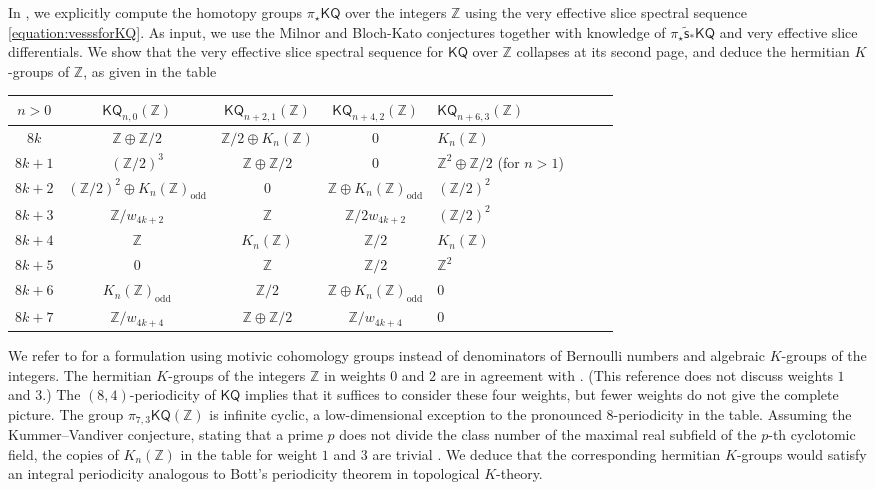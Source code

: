 \documentclass[11pt,hyp,english]{article}
\newcommand{\Z}{\mathbb{Z}}
\newcommand{\KQ}{\mathsf{KQ}}
\newcommand{\vs}{\tilde{\mathsf{s}}}
\theoremstyle{definition}
\begin{document}
In , 
we explicitly compute the homotopy groups $\pi_{\star}\KQ$ over the integers $\mathbb{Z}$
using the very effective slice spectral sequence \eqref{equation:vesssforKQ}. 
As input, we use the Milnor and Bloch-Kato conjectures together with knowledge of 
$\pi_{\star}\vs_{\ast}\KQ$ and very effective slice differentials. 
We show that the very effective slice spectral sequence for $\KQ$ over $\mathbb{Z}$ 
collapses at its second page, 
and deduce the hermitian $K$-groups of $\mathbb{Z}$, as given in the table 
\begin{center}
 \begin{tabularx}{\textwidth}{c | c | c | c | l l l l} 
 \toprule
 $n>0$ 
 & $\KQ_{n,0}(\mathbb{Z})$ & $\KQ_{n+2,1}(\mathbb{Z})$ & $\KQ_{n+4,2}(\mathbb{Z})$ & $\KQ_{n+6,3}(\mathbb{Z})$ \\
 \midrule
$8k$ & $\mathbb{Z}\oplus\mathbb{Z}/2$ & $\Z/2\oplus K_n(\Z)$ & $0$  & $K_n(\Z)$ \\
$8k+1$ & $(\mathbb{Z}/2)^{3}$ & $\Z\oplus \Z/2$ & $0$ & $\Z^2\oplus \Z/2$ (for $n>1$)\\
$8k+2$ & $(\mathbb{Z}/2)^{2}\oplus K_{n}(\mathbb{Z})_{\text{odd}}$ & $0$ & $\Z\oplus K_{n}(\Z)_\mathrm{odd}$ & $(\Z/2)^2$\\
$8k+3$ & $\mathbb{Z}/w_{4k+2}$ & $\Z$ & $\Z/2w_{4k+2}$ & $(\Z/2)^2$ \\
$8k+4$ & $\mathbb{Z}$ & $K_n(\Z)$ & $\Z/2$ & $K_n(\Z)$ \\
$8k+5$ & $0$ & $\Z$ & $\Z/2$ & $\Z^2$\\
$8k+6$ & $K_{n}(\mathbb{Z})_{\text{odd}}$ & $\Z/2$& $\Z\oplus K_n(\Z)_{\mathrm{odd}}$ & $0$ \\
$8k+7$ & $\mathbb{Z}/w_{4k+4}$ & $\Z\oplus \Z/2$ & $\Z/w_{4k+4}$ & $0$ \\
\bottomrule
\end{tabularx}
\end{center}

We refer to  for a formulation using motivic cohomology groups instead of 
denominators of Bernoulli numbers and algebraic $K$-groups of the integers. 
The hermitian $K$-groups of the integers $\mathbb{Z}$ in weights $0$ and $2$ are in 
agreement with \cite[Theorem 3.2.1]{9.III}. 
(This reference does not discuss weights $1$ and $3$.)
The $(8,4)$-periodicity of $\KQ$ implies that it suffices to consider these four weights, 
but fewer weights do not give the complete picture.
The group $\pi_{7,3}\KQ(\Z)$ is infinite cyclic, 
a low-dimensional exception to the pronounced $8$-periodicity in the table.
Assuming the Kummer–Vandiver conjecture, 
stating that a prime \(p\) does not divide the class number of the maximal real subfield
of the \(p\)-th cyclotomic field,
the copies of $K_n(\Z)$ in the table for weight $1$ and $3$ are trivial 
\cite{zbMATH00034713}.
We deduce that the corresponding hermitian $K$-groups would satisfy an integral 
periodicity analogous to Bott's periodicity theorem in topological $K$-theory.
\end{document}
